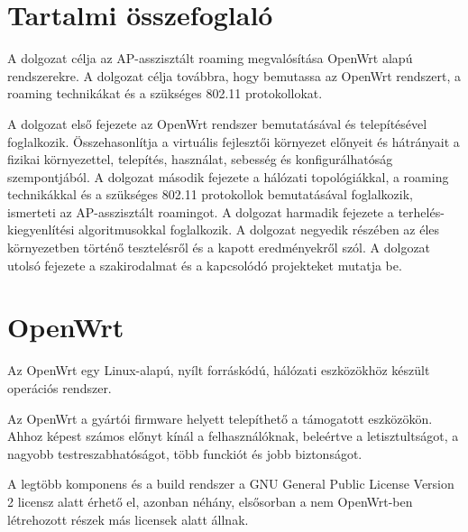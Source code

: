 \documentclass[12pt]{article}
\begin{document}
\section*{Tartalmi összefoglaló}

%

A dolgozat célja az AP-asszisztált roaming megvalósítása OpenWrt alapú rendszerekre.
A dolgozat célja továbbra, hogy bemutassa az OpenWrt rendszert, a roaming technikákat és a szükséges 802.11 protokollokat.

A dolgozat első fejezete az OpenWrt rendszer bemutatásával és telepítésével foglalkozik. Összehasonlítja a virtuális fejlesztői környezet előnyeit és hátrányait a fizikai környezettel, telepítés, használat, sebesség és konfigurálhatóság szempontjából.
A dolgozat második fejezete a hálózati topológiákkal, a roaming technikákkal és a szükséges 802.11 protokollok bemutatásával foglalkozik, ismerteti az AP-asszisztált roamingot.
A dolgozat harmadik fejezete a terhelés-kiegyenlítési algoritmusokkal foglalkozik.
A dolgozat negyedik részében az éles környezetben történő tesztelésről és a kapott eredményekről szól.
A dolgozat utolsó fejezete a szakirodalmat és a kapcsolódó projekteket mutatja be.

\newpage

\section{OpenWrt}

Az OpenWrt egy Linux-alapú, nyílt forráskódú, hálózati eszközökhöz készült operációs rendszer.

Az OpenWrt a gyártói firmware helyett telepíthető a támogatott eszközökön. Ahhoz képest számos előnyt kínál a felhasználóknak, beleértve a letisztultságot, a nagyobb testreszabhatóságot, több funckiót és jobb biztonságot.

A legtöbb komponens és a build rendszer a GNU General Public License Version 2 licensz alatt érhető el, azonban néhány, elsősorban a nem OpenWrt-ben létrehozott részek más licensek alatt állnak. \cite{openwrt_about} \cite{openwrt_faq} \cite{openwrt_home}
\end{document}
